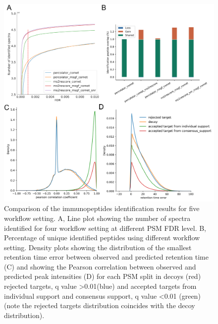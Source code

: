 \documentclass[12pt]{article}
\begin{document}
\begin{figure}[h!]
	\centering
	\includegraphics[width=1\textwidth]{figures//PXD019643.png}
	\caption{Comparison of the immunopeptides identification results for five workflow setting. A, Line plot showing the number of spectra identified for four workflow setting at different PSM FDR level. B, Percentage of unique identified peptides using different workflow setting. Density plots showing the distribution of the smallest retention time error between observed and predicted retention time (C) and showing the Pearson correlation between observed and predicted peak intensities (D) for each PSM split in decoys (red) rejected targets, q value >0.01(blue) and accepted targets from individual support and consensus support, q value <0.01 (green) (note the rejected targets distribution coincides with the decoy distribution).}
	\label{fig:PXD019643_immunopeptides}
\end{figure}
\end{document}

